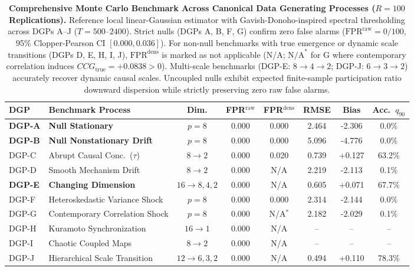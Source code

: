 \documentclass[10pt,twocolumn,journal]{article}
\begin{document}
\begin{table}[t]
\centering
\footnotesize
\renewcommand{\arraystretch}{0.90}
\caption{\textbf{Comprehensive Monte Carlo Benchmark Across Canonical Data Generating Processes ($R=100$ Replications).} Reference local linear-Gaussian estimator with Gavish-Donoho-inspired spectral thresholding across DGPs A--J ($T=500$--$2400$). Strict nulls (DGPs A, B, F, G) confirm zero false alarms ($\text{FPR}^{\text{raw}} = 0/100$, 95\% Clopper-Pearson CI $[0.000, 0.036]$). For non-null benchmarks with true emergence or dynamic scale transitions (DGPs D, E, H, I, J), $\text{FPR}^{\text{dens}}$ is marked as not applicable (N/A; $\text{N/A}^*$ for G where contemporary correlation induces $CCG_{\text{true}} = +0.0838 > 0$). Multi-scale benchmarks (DGP-E: $8 \to 4 \to 2$; DGP-J: $6 \to 3 \to 2$) accurately recover dynamic causal scales. Uncoupled nulls exhibit expected finite-sample participation ratio downward dispersion while strictly preserving zero raw false alarms.}
\label{tab:benchmarks}
\begin{tabular*}{\textwidth}{@{\extracolsep{\fill}}llcccccc@{}}
\toprule
\textbf{DGP} & \textbf{Benchmark Process} & \textbf{Dim.} & \textbf{FPR$^{\text{raw}}$} & \textbf{FPR$^{\text{dens}}$} & \textbf{RMSE} & \textbf{Bias} & \textbf{Acc.~$q_{90}$} \\
\midrule
\textbf{DGP-A} & \textbf{Null Stationary} & $p=8$ & 0.000 & 0.000 & 2.464 & -2.306 & 0.0\% \\
\textbf{DGP-B} & \textbf{Null Nonstationary Drift} & $p=8$ & 0.000 & 0.000 & 5.096 & -4.776 & 0.0\% \\
DGP-C & Abrupt Causal Conc.~($\tau$) & $8 \to 2$ & 0.000 & 0.020 & 0.739 & +0.127 & 63.2\% \\
DGP-D & Smooth Mechanism Drift & $8 \to 2$ & 0.000 & N/A & 2.219 & -2.113 & 0.1\% \\
\textbf{DGP-E} & \textbf{Changing Dimension} & $16 \to 8,4,2$ & 0.000 & N/A & 0.605 & +0.071 & 67.7\% \\
DGP-F & Heteroskedastic Variance Shock & $p=8$ & 0.000 & 0.000 & 2.314 & -2.144 & 0.0\% \\
DGP-G & Contemporary Correlation Shock & $p=8$ & 0.000 & N/A$^*$ & 2.182 & -2.029 & 0.1\% \\
DGP-H & Kuramoto Synchronization & $16 \to 1$ & 0.000 & N/A & -- & -- & -- \\
DGP-I & Chaotic Coupled Maps & $8 \to 2$ & 0.000 & N/A & -- & -- & -- \\
DGP-J & Hierarchical Scale Transition & $12 \to 6,3,2$ & 0.000 & N/A & 0.494 & +0.110 & 78.3\% \\
\bottomrule
\end{tabular*}
\end{table}
\end{document}
